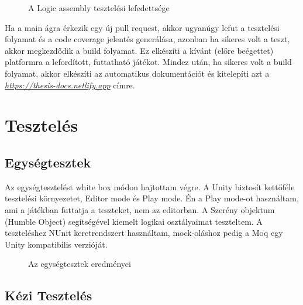 \begin{figure}[H]
	\noindent{}
	\caption{A Logic assembly tesztelési lefedettsége}
	\label{codeCoverage}
\end{figure}

Ha a main ágra érkezik egy új pull request, akkor ugyanúgy lefut a tesztelési folyamat és a code coverage jelentés generálása, azonban ha sikeres volt a teszt, akkor megkezdődik a build folyamat. Ez elkészíti a kívánt (előre beégettet) platformra a lefordított, futtatható játékot. Mindez után, ha sikeres volt a build folyamat, akkor elkészíti az automatikus dokumentációt és kitelepíti azt a \textit{\url{https://thesis-docs.netlify.app}} címre.

\cleardoublepage
\section{Tesztelés}

\subsection{Egységtesztek}
Az egységtesztelést white box módon hajtottam végre. A Unity biztosít kettőféle tesztelési környezetet, Editor mode és Play mode. Én a Play mode-ot használtam, ami a játékban futtatja a teszteket, nem az editorban. A Szerény objektum (Humble Object) segítségével kiemelt logikai osztályaimat teszteltem. A teszteléshez NUnit keretrendszert használtam, mock-oláshoz pedig a Moq egy Unity kompatibilis verzióját.

\begin{figure}[H]
	\noindent{}
	\caption{Az egységtesztek eredményei}
	\label{tests}
\end{figure}

\subsection{Kézi Tesztelés}

